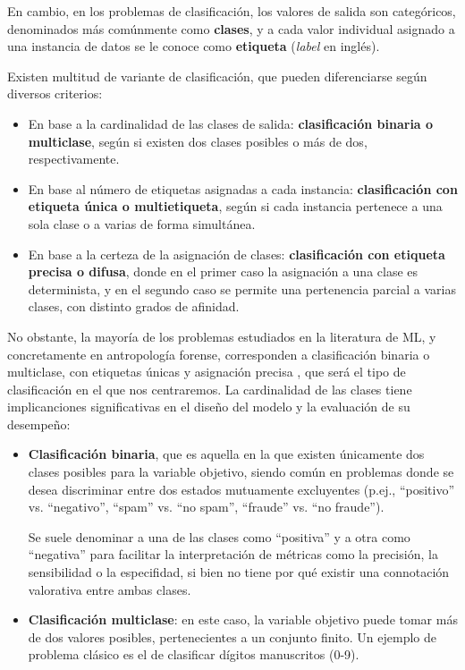 En cambio, en los problemas de clasificación, los valores de salida son categóricos, denominados más comúnmente como \textbf{clases}, y a cada valor individual asignado a una instancia de datos se le conoce como \textbf{etiqueta} (\textit{label} en inglés).

Existen multitud de variante de clasificación, que pueden diferenciarse según diversos criterios:

\begin{itemize}
    \item En base a la cardinalidad de las clases de salida: \textbf{clasificación binaria o multiclase}, según si existen dos clases posibles o más de dos, respectivamente.

    \item En base al número de etiquetas asignadas a cada instancia: \textbf{clasificación con etiqueta única o multietiqueta}, según si cada instancia pertenece a una sola clase o a varias de forma simultánea.

    \item En base a la certeza de la asignación de clases: \textbf{clasificación con etiqueta precisa o difusa}, donde en el primer caso la asignación a una clase es determinista, y en el segundo caso se permite una pertenencia parcial a varias clases, con distinto grados de afinidad.
    
\end{itemize}

No obstante, la mayoría de los problemas estudiados en la literatura de \acrshort{ML}, y concretamente en antropología forense, corresponden a clasificación binaria o multiclase, con etiquetas únicas y asignación precisa \cite{bishop2006}, que será el tipo de clasificación en el que nos centraremos. La cardinalidad de las clases tiene implicanciones significativas en el diseño del modelo y la evaluación de su desempeño:

\begin{itemize}

    \item \textbf{Clasificación binaria}, que es aquella en la que existen únicamente dos clases posibles para la variable objetivo, siendo común en problemas donde se desea discriminar entre dos estados mutuamente excluyentes (p.ej., ``positivo'' vs. ``negativo'', ``spam'' vs. ``no spam'', ``fraude'' vs. ``no fraude'').
    
    Se suele denominar a una de las clases como ``positiva'' y a otra como ``negativa'' para facilitar la interpretación de métricas como la precisión, la sensibilidad o la especifidad, si bien no tiene por qué existir una connotación valorativa entre ambas clases.
    
    \item \textbf{Clasificación multiclase}: en este caso, la variable objetivo puede tomar más de dos valores posibles, pertenecientes a un conjunto finito. Un ejemplo de problema clásico es el de clasificar dígitos manuscritos (0-9).

\end{itemize}

